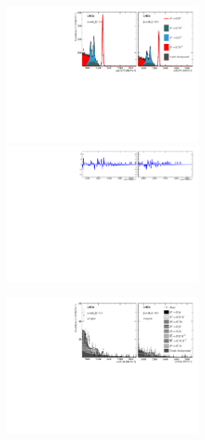 \begin{figure}[!h]
    \centering
    \begin{subfigure}[t]{1.0\textwidth}
        \centering
        \includegraphics[width=0.7\textwidth]{figs/Appendix_FitCategories/canvas_DsD0_Ds2KKPi_both_summed_splitHel_splitKKPi_s21_s21r1_s24_s26.pdf}\\
        \includegraphics[width=0.7\textwidth]{figs/Appendix_FitCategories/residuals_DsD0_Ds2KKPi_both_summed_splitHel_splitKKPi_s21_s21r1_s24_s26.pdf}
    \end{subfigure}
    \begin{subfigure}[t]{1.0\textwidth}
        \centering
        \includegraphics[width=0.7\textwidth]{figs/Appendix_FitCategories/canvas_DsPhi_Ds2KKPi_both_summed_splitHel_splitKKPi_s21_s21r1_s24_s26.pdf}\\

\end{subfigure}
\end{figure}

